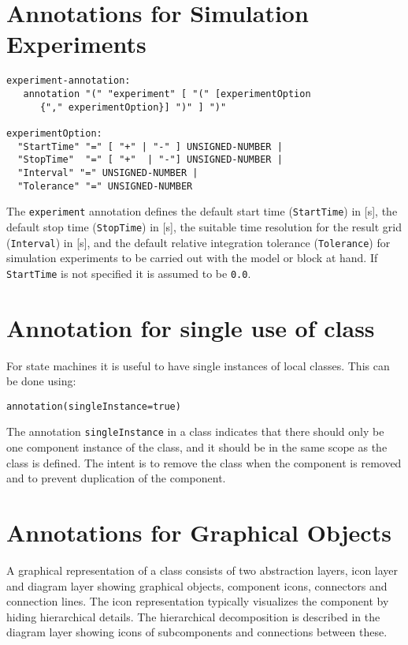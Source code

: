 \section{Annotations for Simulation Experiments}\label{annotations-for-simulation-experiments}
\begin{lstlisting}[language=grammar]
experiment-annotation:
   annotation "(" "experiment" [ "(" [experimentOption
      {"," experimentOption}] ")" ] ")"

experimentOption:
  "StartTime" "=" [ "+" | "-" ] UNSIGNED-NUMBER |
  "StopTime"  "=" [ "+"  | "-"] UNSIGNED-NUMBER |
  "Interval" "=" UNSIGNED-NUMBER |
  "Tolerance" "=" UNSIGNED-NUMBER
\end{lstlisting}

The \lstinline!experiment! annotation defines the default start time (\lstinline!StartTime!) in {[}s{]}, the default stop time (\lstinline!StopTime!) in {[}s{]}, the suitable time resolution for the result grid (\lstinline!Interval!) in {[}s{]}, and the default relative integration tolerance (\lstinline!Tolerance!) for simulation experiments to be carried out with the model or block at hand.  If \lstinline!StartTime! is not specified it is assumed to be \lstinline!0.0!.

\section{Annotation for single use of class}\label{annotation-for-single-use-of-class}

For state machines it is useful to have single instances of local
classes. This can be done using:
\begin{lstlisting}[language=modelica]
annotation(singleInstance=true)
\end{lstlisting}

The annotation \lstinline!singleInstance! in a class indicates that there should
only be one component instance of the class, and it should be in the
same scope as the class is defined. The intent is to remove the class
when the component is removed and to prevent duplication of the
component.

\section{Annotations for Graphical Objects}\label{annotations-for-graphical-objects}

A graphical representation of a class consists of two abstraction
layers, icon layer and diagram layer showing graphical objects,
component icons, connectors and connection lines. The icon
representation typically visualizes the component by hiding hierarchical
details. The hierarchical decomposition is described in the diagram
layer showing icons of subcomponents and connections between these.

